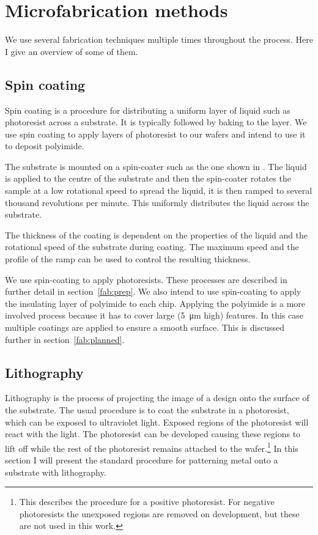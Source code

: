 \section{Microfabrication methods}

We use several fabrication techniques multiple times throughout the process.
Here I give an overview of some of them.

\subsection{Spin coating}
\label{fab:spin}


Spin coating is a procedure for distributing a uniform layer of liquid such as
photoresist  across a substrate. It is typically followed by baking to
 the layer. We use spin coating to apply layers of photoresist to
our wafers and intend to use it to deposit polyimide.

The substrate is mounted on a spin-coater such as the one shown in . The liquid is applied to the centre of the substrate and then the
spin-coater rotates the sample at a low rotational speed to spread the
liquid, it is then ramped to several thousand revolutions per minute.
This uniformly distributes the liquid across the substrate.

The thickness of the coating is dependent on the properties of the liquid
 and the rotational speed of the substrate during coating.
The maximum speed and the profile of the ramp can be used to control the
resulting thickness.

We use spin-coating to apply photoresists. These processes are described in
further detail in section~\ref{fab:prep}. We also intend to use spin-coating
to apply the insulating layer of polyimide to each chip. Applying the
polyimide is a more involved process because it has to cover large
(\SI{5}{\micro\meter} high) features. In this case multiple coatings are
applied to ensure a smooth surface. This is discussed further in
section~\ref{fab:planned}.

\subsection{Lithography}

Lithography is the process of projecting the image of a design onto the surface
of the substrate. The usual procedure is to coat the substrate in a
photoresist, which can be exposed to ultraviolet light. Exposed regions of the
photoresist will react with the light. The photoresist can be developed causing
these regions to lift off while the rest of the photoresist remains attached to
the wafer.\footnote{This describes the procedure for a positive photoresist.
For negative photoresists the unexposed regions are removed on development, but
these are not used in this work.} In this section I will present the standard
procedure for patterning metal onto a substrate with lithography.

